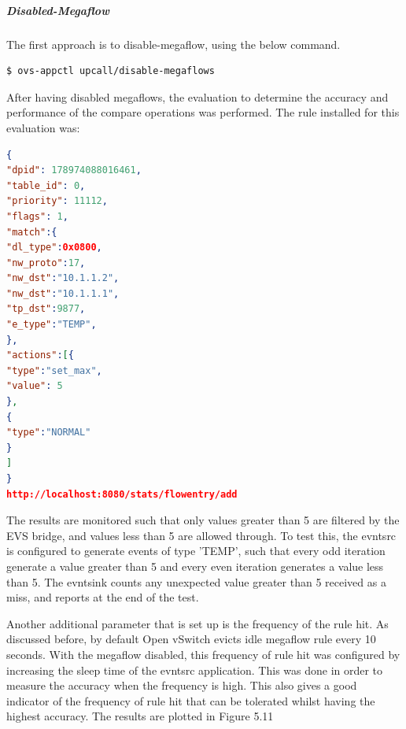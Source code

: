 \subparagraph*{Disabled-Megaflow}
The first approach is to disable-megaflow, using the below command.

	\begin{lstlisting}[language=bash]
$ ovs-appctl upcall/disable-megaflows \end{lstlisting}

After having disabled megaflows, the evaluation to determine the accuracy and performance of the compare operations was performed. The rule installed for this evaluation was:

\begin{lstlisting}[language=json,firstnumber=1]
{
"dpid": 178974088016461,
"table_id": 0,
"priority": 11112,
"flags": 1,
"match":{
"dl_type":0x0800,
"nw_proto":17,
"nw_dst":"10.1.1.2",
"nw_dst":"10.1.1.1",
"tp_dst":9877,
"e_type":"TEMP",
},
"actions":[{
"type":"set_max",
"value": 5
},
{
"type":"NORMAL"
}
]
}
http://localhost:8080/stats/flowentry/add \end{lstlisting}

The results are monitored such that only values greater than 5 are filtered by the EVS bridge, and values less than 5 are allowed through. To test this, the evntsrc is configured to generate events of type 'TEMP', such that every odd iteration generate a value greater than 5 and every even iteration generates a value less than 5. The evntsink counts any unexpected value greater than 5 received as a miss, and reports at the end of the test. 

Another additional parameter that is set up is the frequency of the rule hit. As discussed before, by default Open vSwitch evicts idle megaflow rule every 10 seconds. With the megaflow disabled, this frequency of rule hit was configured by increasing the sleep time of the evntsrc application. This was done in order to measure the accuracy when the frequency is high. This also gives a good indicator of the frequency of rule hit that can be tolerated whilst having the highest accuracy. The results are plotted in Figure 5.11


